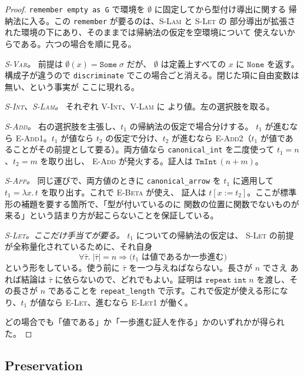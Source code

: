 \documentclass[11pt,a4paper]{ltjsarticle}
\newcommand{\tint}{\mathtt{int}}
\newcommand{\subst}[3]{#1[#2 := #3]}
\begin{document}
\begin{proof}
\texttt{remember empty as G} で環境を $\emptyset$ に固定してから型付け導出に関する
帰納法に入る。この \texttt{remember} が要るのは、\textsc{S-Lam} と \textsc{S-Let} の
部分導出が拡張された環境の下にあり、そのままでは帰納法の仮定を空環境について
使えないからである。六つの場合を順に見る。

\medskip
\emph{\textsc{S-Var}。} 前提は $\emptyset(x) = \mathtt{Some}\;\sigma$ だが、
$\emptyset$ は定義上すべての $x$ に $\mathtt{None}$ を返す。構成子が違うので
\texttt{discriminate} でこの場合ごと消える。閉じた項に自由変数は無い、という事実が
ここに現れる。

\medskip
\emph{\textsc{S-Int}、\textsc{S-Lam}。} それぞれ \textsc{V-Int}、\textsc{V-Lam} に
より値。左の選択肢を取る。

\medskip
\emph{\textsc{S-Add}。} 右の選択肢を主張し、$t_1$ の帰納法の仮定で場合分けする。
$t_1$ が進むなら \textsc{E-Add1}。$t_1$ が値なら $t_2$ の仮定で分け、$t_2$ が進むなら
\textsc{E-Add2}（$t_1$ が値であることがその前提として要る）。両方値なら
\texttt{canonical\_int} を二度使って $t_1 = n$、$t_2 = m$ を取り出し、
\textsc{E-Add} が発火する。証人は $\mathtt{TmInt}\,(n+m)$。

\medskip
\emph{\textsc{S-App}。} 同じ運びで、両方値のときに \texttt{canonical\_arrow} を
$t_1$ に適用して $t_1 = \lambda x.\,t$ を取り出す。これで \textsc{E-Beta} が使え、
証人は $\subst{t}{x}{t_2}$。ここが標準形の補題を要する箇所で、「型が付いているのに
関数の位置に関数でないものが来る」という詰まり方が起こらないことを保証している。

\medskip
\emph{\textsc{S-Let}。ここだけ手当てが要る。} $t_1$ についての帰納法の仮定は、
\textsc{S-Let} の前提が全称量化されているために、それ自身
\[
  \forall \bar\tau.\; |\bar\tau| = n \Rightarrow
  \bigl(\text{$t_1$ は値であるか一歩進む}\bigr)
\]
という形をしている。使う前に $\bar\tau$ を一つ与えねばならない。長さが $n$ でさえ
あれば結論は $\bar\tau$ に依らないので、どれでもよい。証明は
$\mathtt{repeat}\;\tint\;n$ を渡し、その長さが $n$ であることを
\texttt{repeat\_length} で示す。これで仮定が使える形になり、$t_1$ が値なら
\textsc{E-Let}、進むなら \textsc{E-Let1} が働く。

\medskip
どの場合でも「値である」か「一歩進む証人を作る」かのいずれかが得られた。
\end{proof}

\subsection{Preservation}
\end{document}

